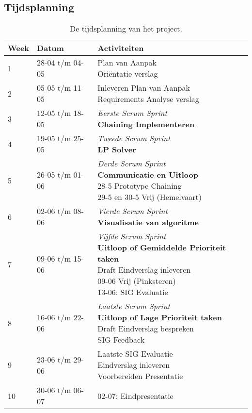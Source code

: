 \begin{appendices}
	\section{Tijdsplanning} \label{app:A}
	\begin{table}[!h]
	\def\arraystretch{1.5}
	\begin{tabularx}{\textwidth}{| p{1cm} | p{3cm}| X |}
	\hline
	\textbf{Week} & \textbf{Datum} & \textbf{Activiteiten} \\ \hline
	1 & 28-04 t/m 04-05 & \specialcell{Plan van Aanpak\\Ori\"entatie verslag}\\ \hline
	2 & 05-05 t/m 11-05 & \specialcell{Inleveren Plan van Aanpak\\Requirements Analyse verslag}\\ \hline
	3 & 12-05 t/m 18-05 & \specialcell{\textit{Eerste Scrum Sprint}\\\textbf{Chaining Implementeren}}\\ \hline
	4 & 19-05 t/m 25-05 & \specialcell{\textit{Tweede Scrum Sprint}\\\textbf{LP Solver}}\\ \hline
	5 & 26-05 t/m 01-06 & \specialcell{\textit{Derde Scrum Sprint}\\\textbf{Communicatie en Uitloop}\\28-5 Prototype Chaining\\29-5 en 30-5 Vrij (Hemelvaart)}\\ \hline
	6 & 02-06 t/m 08-06 & \specialcell{\textit{Vierde Scrum Sprint}\\\textbf{Visualisatie van algoritme}}\\ \hline
	7 & 09-06 t/m 15-06 & \specialcell{\textit{Vijfde Scrum Sprint}\\\textbf{Uitloop of Gemiddelde Prioriteit taken}\\Draft Eindverslag inleveren\\09-06 Vrij (Pinksteren)\\13-06: SIG Evaluatie}\\ \hline
	8 & 16-06 t/m 22-06 & \specialcell{\textit{Laatste Scrum Sprint}\\\textbf{Uitloop of Lage Prioriteit taken}\\Draft Eindverslag bespreken\\SIG Feedback}\\ \hline
	9 & 23-06 t/m 29-06 & \specialcell{Laatste SIG Evaluatie\\Eindverslag inleveren\\Voorbereiden Presentatie}\\ \hline
	10 & 30-06 t/m 06-07 & 02-07: Eindpresentatie\\ \hline
	\end{tabularx}
	\caption{De tijdsplanning van het project.}
	\end{table}

\end{appendices}